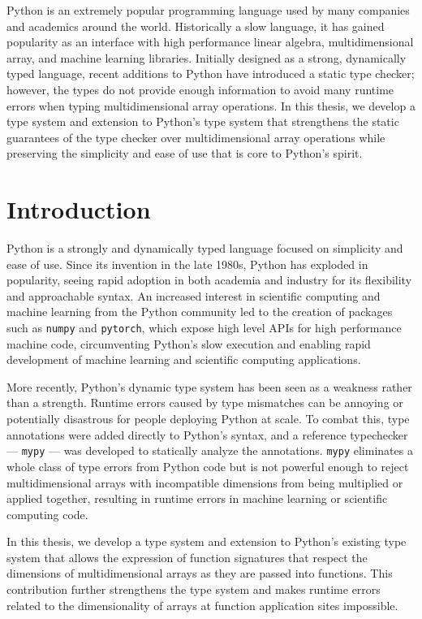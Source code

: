 \documentclass[12pt]{report}
\begin{document}
Python is an extremely popular programming language used by many companies and academics around the world. Historically a slow language, it has gained popularity as an interface with high performance linear algebra, multidimensional array, and machine learning libraries. Initially designed as a strong, dynamically typed language, recent additions to Python have introduced a static type checker; however, the types do not provide enough information to avoid many runtime errors when typing multidimensional array operations. In this thesis, we develop a type system and extension to Python's type system that strengthens the static guarantees of the type checker over multidimensional array operations while preserving the simplicity and ease of use that is core to Python's spirit.

\tableofcontents

\chapter{Introduction}

Python is a strongly and dynamically typed language focused on simplicity and ease of use. Since its invention in the late 1980s, Python has exploded in popularity, seeing rapid adoption in both academia and industry for its flexibility and approachable syntax. An increased interest in scientific computing and machine learning from the Python community led to the creation of packages such as \texttt{numpy} and \texttt{pytorch}, which expose high level APIs for high performance machine code, circumventing Python's slow execution and enabling rapid development of machine learning and scientific computing applications.

More recently, Python's dynamic type system has been seen as a weakness rather than a strength. Runtime errors caused by type mismatches can be annoying or potentially disastrous for people deploying Python at scale. To combat this, type annotations were added directly to Python's syntax, and a reference typechecker --- \texttt{mypy} --- was developed to statically analyze the annotations. \texttt{mypy} eliminates a whole class of type errors from Python code but is not powerful enough to reject multidimensional arrays with incompatible dimensions from being multiplied or applied together, resulting in runtime errors in machine learning or scientific computing code.

In this thesis, we develop a type system and extension to Python's existing type system that allows the expression of function signatures that respect the dimensions of multidimensional arrays as they are passed into functions. This contribution further strengthens the type system and makes runtime errors related to the dimensionality of arrays at function application sites impossible.
\end{document}
